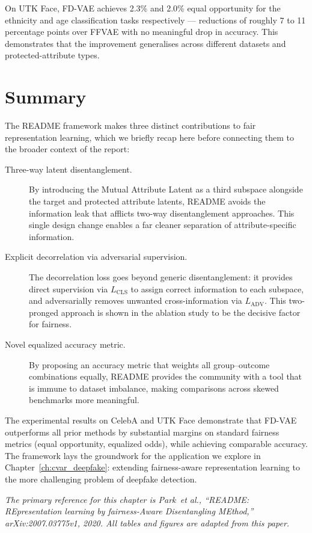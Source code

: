 On UTK Face, FD-VAE achieves 2.3\% and 2.0\% equal opportunity for the ethnicity and age
classification tasks respectively --- reductions of roughly 7 to 11 percentage points over FFVAE
with no meaningful drop in accuracy. This demonstrates that the improvement generalises across
different datasets and protected-attribute types.

\section{Summary}
\label{sec:readme-summary}

The README framework makes three distinct contributions to fair representation learning, which we
briefly recap here before connecting them to the broader context of the report:

\begin{description}
    \item[Three-way latent disentanglement.] By introducing the Mutual Attribute Latent as a
          third subspace alongside the target and protected attribute latents, README avoids the
          information leak that afflicts two-way disentanglement approaches. This single design
          change enables a far cleaner separation of attribute-specific information.

    \item[Explicit decorrelation via adversarial supervision.] The decorrelation loss goes beyond
          generic disentanglement: it provides direct supervision via $L_\text{CLS}$ to assign
          correct information to each subspace, and adversarially removes unwanted cross-information
          via $L_\text{ADV}$. This two-pronged approach is shown in the ablation study to be the
          decisive factor for fairness.

    \item[Novel equalized accuracy metric.] By proposing an accuracy metric that weights all
          group--outcome combinations equally, README provides the community with a tool that is
          immune to dataset imbalance, making comparisons across skewed benchmarks more meaningful.
\end{description}

The experimental results on CelebA and UTK Face demonstrate that FD-VAE outperforms all prior
methods by substantial margins on standard fairness metrics (equal opportunity, equalized odds),
while achieving comparable accuracy. The framework lays the groundwork for the application we
explore in Chapter~\ref{ch:cvar_deepfake}: extending fairness-aware representation learning to the
more challenging problem of deepfake detection.

\vspace{2em}
\noindent\textit{The primary reference for this chapter is Park~\emph{et al.}, ``README: REpresentation
learning by fairness-Aware Disentangling MEthod,'' arXiv:2007.03775v1, 2020. All tables and figures
are adapted from this paper.}